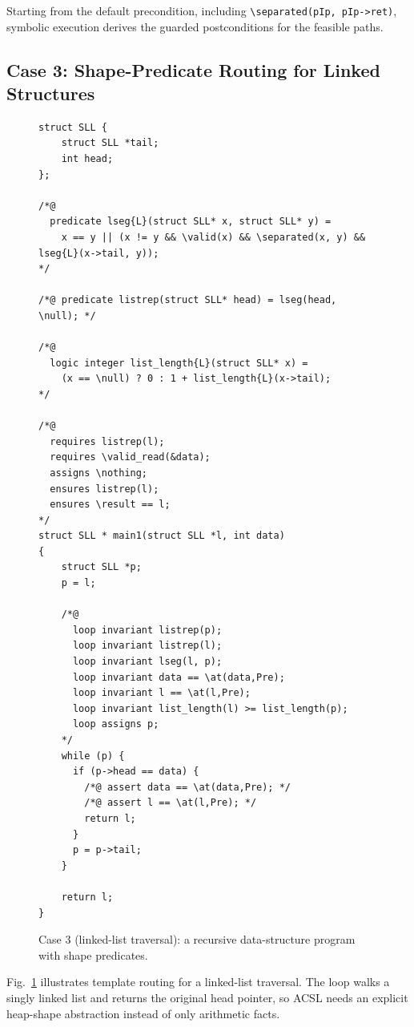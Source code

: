 {Starting from the default precondition, including \texttt{\textbackslash separated(pIp, pIp->ret)}, symbolic execution derives the guarded postconditions for the feasible paths.}
\subsection{Case 3: Shape-Predicate Routing for Linked Structures}

\begin{figure}[!t]
    \centering
    \begin{tcolorbox}[casebox, title={Case 3: route-selected shape predicates}]
\begin{lstlisting}[style=caseinnerstyle]
struct SLL {
    struct SLL *tail;
    int head;
};

/*@
  predicate lseg{L}(struct SLL* x, struct SLL* y) =
    x == y || (x != y && \valid(x) && \separated(x, y) && lseg{L}(x->tail, y));
*/

/*@ predicate listrep(struct SLL* head) = lseg(head, \null); */

/*@
  logic integer list_length{L}(struct SLL* x) =
    (x == \null) ? 0 : 1 + list_length{L}(x->tail);
*/

/*@
  requires listrep(l);
  requires \valid_read(&data);
  assigns \nothing;
  ensures listrep(l);
  ensures \result == l;
*/
struct SLL * main1(struct SLL *l, int data)
{
    struct SLL *p;
    p = l;

    /*@
      loop invariant listrep(p);
      loop invariant listrep(l);
      loop invariant lseg(l, p);
      loop invariant data == \at(data,Pre);
      loop invariant l == \at(l,Pre);
      loop invariant list_length(l) >= list_length(p);
      loop assigns p;
    */
    while (p) {
      if (p->head == data) {
        /*@ assert data == \at(data,Pre); */
        /*@ assert l == \at(l,Pre); */
        return l;
      }
      p = p->tail;
    }

    return l;
}
\end{lstlisting}
    \end{tcolorbox}
    \caption{Case 3 (linked-list traversal): a recursive data-structure program with shape predicates.}
    \label{fig:case4}
\end{figure}

Fig.~\ref{fig:case4} illustrates template routing for a linked-list traversal. The loop walks a singly linked list and returns the original head pointer, so ACSL needs an explicit heap-shape abstraction instead of only arithmetic facts.

